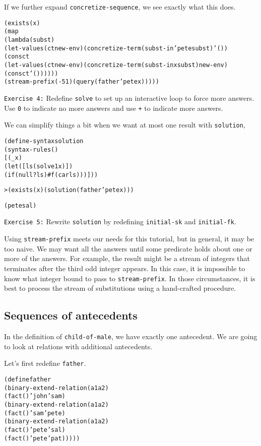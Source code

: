 If we further expand \texttt{concretize-sequence}, we see
exactly what this does.

\begin{alltt}
(exists (x)
  (map 
    (lambda (subst)
      (let-values (ct new-env) (concretize-term (subst-in 'pete subst) '())
        (cons ct
          (let-values (ct new-env) (concretize-term (subst-in x subst) new-env)
            (cons ct '())))))
    (stream-prefix (- 5 1) (query (father 'pete x)))))
\end{alltt}

\texttt{Exercise 4:} Redefine \texttt{solve} to set up an interactive
loop to force more answers.  Use \texttt{0} to indicate no more
answers and use \texttt{+} to indicate more answers.

We can simplify things a bit when we want at most one result with
\texttt{solution},

\begin{alltt}
(define-syntax solution
  (syntax-rules ()
    [(_ x)
     (let ([ls (solve 1 x)])
       (if (null? ls) #f (car ls)))]))
\end{alltt}

\begin{alltt}
> (exists (x) (solution (father 'pete x)))

(pete sal)
\end{alltt}

\texttt{Exercise 5:} Rewrite \texttt{solution} by redefining
\texttt{initial-sk} and \texttt{initial-fk}.

Using \texttt{stream-prefix} meets our needs for this tutorial, but in
general, it may be too naive.  We may want all the answers until some
predicate holds about one or more of the answers.  For example, the
result might be a stream of integers that terminates after the third odd
integer appears.  In this case, it is impossible to know what integer bound
to pass to \texttt{stream-prefix}.  In those circumstances, it is best
to process the stream of substitutions using a hand-crafted procedure.
\newpage
\subsection{Sequences of antecedents}

In the definition of \texttt{child-of-male}, we have exactly one
antecedent.  We are going to look at relations with additional
antecedents.

Let's first redefine \texttt{father}.

\begin{alltt}
(define father
  (binary-extend-relation (a1 a2)
    (fact () 'john 'sam)
      (binary-extend-relation (a1 a2)
        (fact () 'sam 'pete)
        (binary-extend-relation (a1 a2)
          (fact () 'pete 'sal)
          (fact () 'pete 'pat)))))
\end{alltt}

